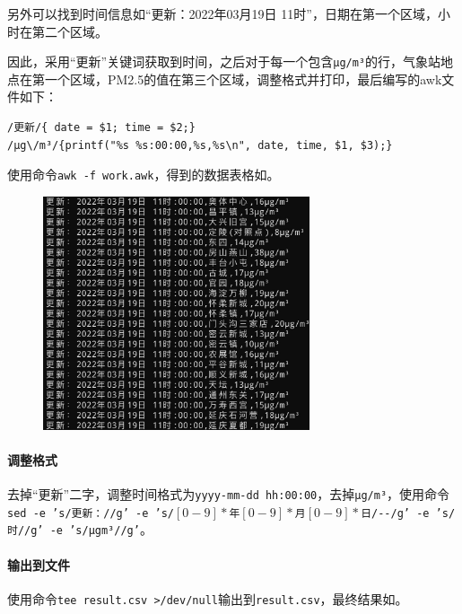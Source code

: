 \documentclass[lang=cn,11pt,a4paper,cite=authornum]{paper}
\begin{document}
另外可以找到时间信息如“更新：2022年03月19日 11时”，日期在第一个区域，小时在第二个区域。

因此，采用“更新”关键词获取到时间，之后对于每一个包含\texttt{μg/m³}的行，气象站地点在第一个区域，PM2.5的值在第三个区域，调整格式并打印，最后编写的awk文件如下：

\begin{code}
    \begin{verbatim}
/更新/{ date = $1; time = $2;}
/μg\/m³/{printf("%s %s:00:00,%s,%s\n", date, time, $1, $3);}
\end{verbatim}
\end{code}

使用命令\texttt{awk -f work.awk}，得到的数据表格如。

\begin{figure}[!htb]
    \centering
    \includegraphics[width=0.7\textwidth]{./images/l1-p2.jpg}
    \caption{\label{fig:p2}}
\end{figure}

\paragraph{调整格式}

去掉“更新”二字，调整时间格式为\texttt{yyyy-mm-dd hh:00:00}，去掉\texttt{μg/m³}，使用命令\texttt{sed -e 's/更新：//g' -e 's/\([0-9]*\)年\([0-9]*\)月\([0-9]*\)日/\1-\2-\3/g' -e 's/时//g' -e 's/μg\/m³//g'}。

\paragraph{输出到文件}

使用命令\texttt{tee result.csv >/dev/null}输出到\texttt{result.csv}，最终结果如。
\end{document}
